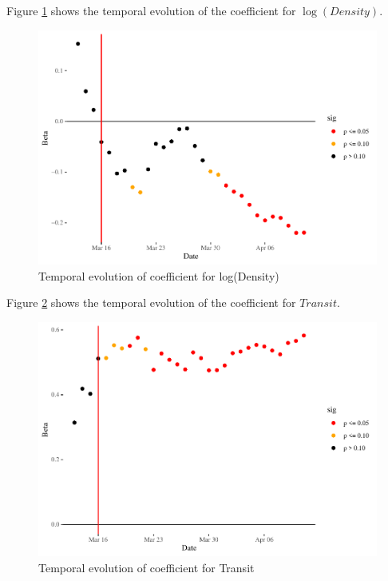 \documentclass[]{elsarticle} %
\makeatletter
\def\maxwidth{\ifdim\Gin@nat@width>\linewidth\linewidth
\else\Gin@nat@width\fi}
\let\Oldincludegraphics\includegraphics
\renewcommand{\includegraphics}[1]{\Oldincludegraphics[width=\maxwidth]{#1}}
\makeatother
\begin{document}
Figure \ref{fig:beta-density-time} shows the temporal evolution of the
coefficient for \(\log(Density)\).

\begin{figure}
\centering
\includegraphics{Environmental-Correlates-of-COVID19-Spain_files/figure-latex/beta-density-time-1.pdf}
\caption{\label{fig:beta-density-time}Temporal evolution of coefficient
for log(Density)}
\end{figure}

Figure \ref{fig:beta-transit-time} shows the temporal evolution of the
coefficient for \(Transit\).

\begin{figure}
\centering
\includegraphics{Environmental-Correlates-of-COVID19-Spain_files/figure-latex/beta-transit-time-1.pdf}
\caption{\label{fig:beta-transit-time}Temporal evolution of coefficient
for Transit}
\end{figure}
\end{document}

